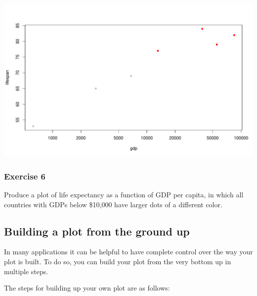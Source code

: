 \documentclass[
]{book}
\begin{document}
\includegraphics{figures/unnamed-chunk-124-1.pdf}

\hypertarget{exercise-6-1}{%
\subsubsection*{Exercise 6}\label{exercise-6-1}}

Produce a plot of life expectancy as a function of GDP per capita, in which all countries with GDPs below \$10,000 have larger dots of a different color.

\hypertarget{building-a-plot-from-the-ground-up}{%
\subsection*{Building a plot from the ground up}\label{building-a-plot-from-the-ground-up}}

In many applications it can be helpful to have complete control over the way your plot is built. To do so, you can build your plot from the very bottom up in multiple steps.

The steps for building up your own plot are as follows:
\end{document}

